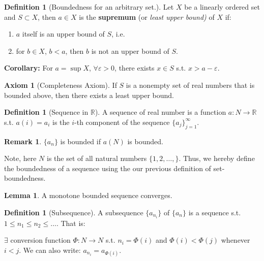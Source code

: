 \documentclass[12pt]{article}
\newcommand{\R}{{\mathbb R}}
\theoremstyle{definition}
\newtheorem{axiom}[theorem]{Axiom}
\newtheorem{definition}[theorem]{Definition}
\newtheorem{lemma}[theorem]{Lemma}
\newtheorem{remark}[theorem]{Remark}
\theoremstyle{plain}
\begin{document}
\begin{definition}
    [Boundedness for an arbitrary set.]

    Let $X$ be a linearly ordered set and $S \subset X$, then $a \in X$ is
    the \textbf{supremum} (or \textit{least upper bound) }of $X$ if:
    \begin{enumerate}
        \item $a$ itself is an upper bound of $S$, i.e.
        \item for $b \in X$, $b < a$, then $b$ is not an upper bound of $S$.
    \end{enumerate}

    \textbf{Corollary: } For $a = \sup X$, $\forall \varepsilon > 0$, there
    exists $x \in S$ s.t. $x > a - \varepsilon$.
\end{definition}

\begin{axiom}
    [Completeness Axiom]
    If $S$ is a nonempty set of real numbers that is bounded above, then there
    exists a least upper bound.
\end{axiom}

\begin{definition}
    [Sequence in $\R$]
    A sequence of real number is a function $a : N \to \R$ s.t. $a(i) = a_i$ is
    the $i$-th component of the sequence $\{a_j\}_{j=1}^\infty$.
\end{definition}

\begin{remark}
    $\{a_n\}$ is bounded if $a(N)$ is bounded.

    Note, here $N$ is the set of all natural numbers $\{1,2,\ldots,\}$. Thus,
    we hereby define the boundedness of a sequence using the our previous
    definition of set-boundedness.
\end{remark}

\begin{lemma}
    \label{lemma:1_B_W_Thm}
    A monotone bounded sequence converges.
\end{lemma}

\begin{definition}
    [Subsequence]

    A subsequence $\{a_{n_i}\}$ of $\{a_n\}$ is a sequence s.t. $1 \le n_1 \le
    n_2 \le \ldots$. That is:

    $ \exists $  conversion function $\Phi : N \to N$ s.t. $n_ i = \Phi(i)$ and
    $\Phi(i) < \Phi(j)$ whenever $i < j$. We can also write: $a_{n_i} =
    a_{\Phi(i)}$.
\end{definition}
\end{document}
